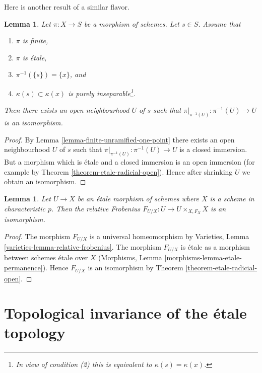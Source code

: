 \documentclass{stacks-project}
\theoremstyle{plain}
\newtheorem{lemma}[subsection]{Lemma}
\theoremstyle{definition}
\theoremstyle{remark}
\numberwithin{equation}{subsection}
\begin{document}
\noindent
Here is another result of a similar flavor.

\begin{lemma}
\label{lemma-finite-etale-one-point}
Let $\pi : X \to S$ be a morphism of schemes. Let $s \in S$.
Assume that
\begin{enumerate}
\item $\pi$ is finite,
\item $\pi$ is \'etale,
\item $\pi^{-1}(\{s\}) = \{x\}$, and
\item $\kappa(s) \subset \kappa(x)$ is purely
inseparable\footnote{In view of condition (2)
this is equivalent to $\kappa(s) = \kappa(x)$.}.
\end{enumerate}
Then there exists an open neighbourhood $U$ of $s$ such that
$\pi|_{\pi^{-1}(U)} : \pi^{-1}(U) \to U$ is an isomorphism.
\end{lemma}

\begin{proof}
By
Lemma \ref{lemma-finite-unramified-one-point}
there exists an open neighbourhood $U$ of $s$ such that
$\pi|_{\pi^{-1}(U)} : \pi^{-1}(U) \to U$ is a closed immersion.
But a morphism which is \'etale and a closed immersion is an
open immersion (for example by
Theorem \ref{theorem-etale-radicial-open}).
Hence after shrinking $U$ we obtain an isomorphism.
\end{proof}

\begin{lemma}
\label{lemma-relative-frobenius-etale}
Let $U \to X$ be an \'etale morphism of schemes
where $X$ is a scheme in characteristic $p$.
Then the relative Frobenius $F_{U/X} : U \to U \times_{X, F_X} X$
is an isomorphism.
\end{lemma}

\begin{proof}
The morphism $F_{U/X}$ is a universal homeomorphism by
Varieties, Lemma \ref{varieties-lemma-relative-frobenius}.
The morphism $F_{U/X}$ is \'etale as a
morphism between schemes \'etale over $X$
(Morphisms, Lemma \ref{morphisms-lemma-etale-permanence}).
Hence $F_{U/X}$ is an isomorphism by
Theorem \ref{theorem-etale-radicial-open}.
\end{proof}






\section{Topological invariance of the \'etale topology}
\label{section-topological-invariance}
\end{document}
